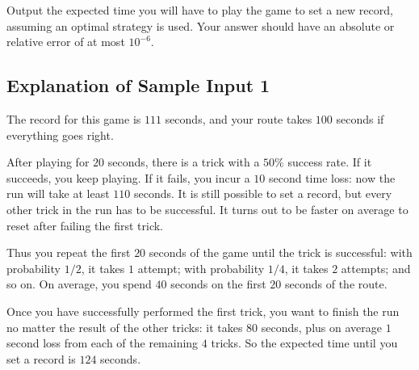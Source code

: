 \begin{Output}
Output the expected time you will have to play the game to set a new record,
assuming an optimal strategy is used. Your answer should have an absolute
or relative error of at most $10^{-6}$.
\end{Output}

\subsection*{Explanation of Sample Input 1}

The record for this game is $111$ seconds, and your route takes 
$100$ seconds if everything goes right.

After playing for $20$ seconds, there is a trick with a $50\%$ success rate. If it
succeeds, you keep playing. If it fails, you incur a $10$ second time loss: now
the run will take at least $110$ seconds. It is still possible to set a record,
but every other trick in the run has to be successful. It turns out to be faster
on average to reset after failing the first trick.

Thus you repeat the first $20$ seconds of the game until the trick is successful:
with probability $1/2$, it takes $1$ attempt; with probability $1/4$, it takes $2$
attempts; and so on. On average, you spend $40$ seconds on the first $20$ seconds
of the route.

Once you have successfully performed the first trick, you want to finish the run
no matter the result of the other tricks: it takes $80$ seconds, plus on average
$1$ second loss from each of the remaining $4$ tricks. So the expected time until you
set a record is $124$ seconds.

